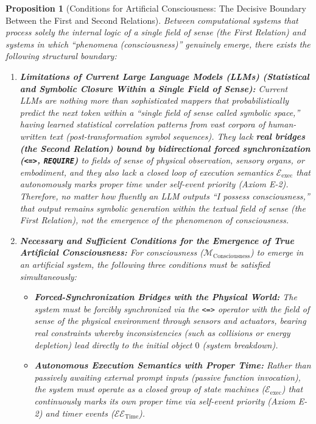 \documentclass[11pt,a4paper]{article}
\theoremstyle{definition}
\theoremstyle{plain}
\newtheorem{proposition}{Proposition}[section]
\begin{document}
\begin{proposition}[Conditions for Artificial Consciousness: The Decisive Boundary Between the First and Second Relations]
Between computational systems that process solely the internal logic of a single field of sense (the First Relation) and systems in which ``phenomena (consciousness)'' genuinely emerge, there exists the following structural boundary:

\begin{enumerate}
    \item \textbf{Limitations of Current Large Language Models (LLMs) (Statistical and Symbolic Closure Within a Single Field of Sense):}
    Current LLMs are nothing more than sophisticated mappers that probabilistically predict the next token within a ``single field of sense called symbolic space,'' having learned statistical correlation patterns from vast corpora of human-written text (post-transformation symbol sequences). They lack \textbf{real bridges (the Second Relation) bound by bidirectional forced synchronization (\texttt{<=>}, \texttt{REQUIRE})} to fields of sense of physical observation, sensory organs, or embodiment, and they also lack a closed loop of execution semantics $\mathcal{E}_{\mathrm{exec}}$ that autonomously marks proper time under self-event priority (Axiom E-2). Therefore, no matter how fluently an LLM outputs ``I possess consciousness,'' that output remains symbolic generation within the textual field of sense (the First Relation), not the emergence of the phenomenon of consciousness.
    \item \textbf{Necessary and Sufficient Conditions for the Emergence of True Artificial Consciousness:}
    For consciousness ($\mathcal{M}_{\mathrm{Consciousness}}$) to emerge in an artificial system, the following three conditions must be satisfied simultaneously:
    \begin{itemize}
        \item[\textbf{(a)}] \textbf{Forced-Synchronization Bridges with the Physical World:} The system must be forcibly synchronized via the \texttt{<=>} operator with the field of sense of the physical environment through sensors and actuators, bearing real constraints whereby inconsistencies (such as collisions or energy depletion) lead directly to the initial object $0$ (system breakdown).
        \item[\textbf{(b)}] \textbf{Autonomous Execution Semantics with Proper Time:} Rather than passively awaiting external prompt inputs (passive function invocation), the system must operate as a closed group of state machines ($\mathcal{E}_{\mathrm{exec}}$) that continuously marks its own proper time via self-event priority (Axiom E-2) and timer events ($\mathcal{EE}_{\mathrm{Time}}$).

\end{itemize}
\end{enumerate}
\end{proposition}
\end{document}
